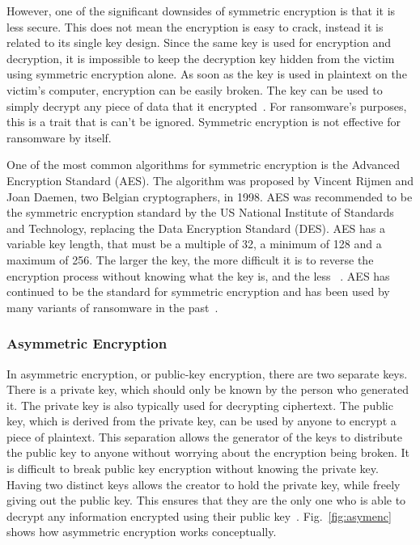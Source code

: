 \documentclass{IEEEtran}
\begin{document}
However, one of the significant downsides of symmetric encryption is that it is less secure. This does not mean the encryption is easy to crack, instead it is related to its single key design. Since the same key is used for encryption and decryption, it is impossible to keep the decryption key hidden from the victim using symmetric encryption alone. As soon as the key is used in plaintext on the victim's computer, encryption can be easily broken. The key can be used to simply decrypt any piece of data that it encrypted~\cite{RN20}. For ransomware's purposes, this is a trait that is can't be ignored. Symmetric encryption is not effective for ransomware by itself.

One of the most common algorithms for symmetric encryption is the Advanced Encryption Standard (AES). The algorithm was proposed by Vincent Rijmen and Joan Daemen, two Belgian cryptographers, in 1998. AES was recommended to be the symmetric encryption standard by the US National Institute of Standards and Technology, replacing the Data Encryption Standard (DES). AES has a  variable key length, that must be a multiple of 32, a minimum of 128 and a maximum of 256. The larger the key, the more difficult it is to reverse the encryption process without knowing what the key is, and the less ~\cite{RN20}. AES has continued to be the standard for symmetric encryption and has been used by many variants of ransomware in the past~\cite{RN25,RN33}. 

\subsubsection{Asymmetric Encryption}\label{asymenc}

In asymmetric encryption, or public-key encryption, there are two separate keys. There is a private key, which should only be known by the person who generated it. The private key is also typically used for decrypting ciphertext. The public key, which is derived from the private key, can be used by anyone to encrypt a piece of plaintext. This separation allows the generator of the keys to distribute the public key to anyone without worrying about the encryption being broken. It is difficult to break public key encryption without knowing the private key. Having two distinct keys allows the creator to hold the private key, while freely giving out the public key. This ensures that they are the only one who is able to decrypt any information encrypted using their public key~\cite{RN20}. Fig.~\ref{fig:asymenc} shows how asymmetric encryption works conceptually.
\end{document}

